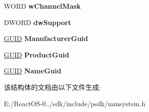 \begin{DoxyCompactItemize}
W\+O\+RD {\bfseries w\+Channel\+Mask}
\item 
\mbox{\label{structtag_m_i_d_i_o_u_t_c_a_p_s2_a_a1cb448c5ba2c68cc2df20ef93e89891f}} 
D\+W\+O\+RD {\bfseries dw\+Support}
\item 
\mbox{\label{structtag_m_i_d_i_o_u_t_c_a_p_s2_a_a50b567804afdbd44b6681dd2656a9176}} 
\hyperlink{interface_g_u_i_d}{G\+U\+ID} {\bfseries Manufacturer\+Guid}
\item 
\mbox{\label{structtag_m_i_d_i_o_u_t_c_a_p_s2_a_a1986ddfa98dbe0535ffdc07603b07c76}} 
\hyperlink{interface_g_u_i_d}{G\+U\+ID} {\bfseries Product\+Guid}
\item 
\mbox{\label{structtag_m_i_d_i_o_u_t_c_a_p_s2_a_a27cf2b47d82ec13e0a7301ade6776812}} 
\hyperlink{interface_g_u_i_d}{G\+U\+ID} {\bfseries Name\+Guid}
\end{DoxyCompactItemize}


该结构体的文档由以下文件生成\+:\begin{DoxyCompactItemize}
\item 
E\+:/\+React\+O\+S-\/0../sdk/include/psdk/mmsystem.\+h\end{DoxyCompactItemize}
